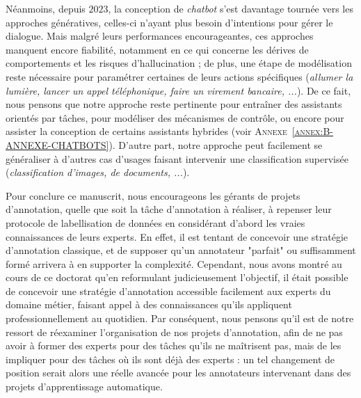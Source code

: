 		Néanmoins, depuis $2023$, la conception de \textit{chatbot} s'est davantage tournée vers les approches génératives, celles-ci n'ayant plus besoin d'intentions pour gérer le dialogue.
		Mais malgré leurs performances encourageantes, ces approches manquent encore fiabilité, notamment en ce qui concerne les dérives de comportements et les risques d'hallucination ; de plus, une étape de modélisation reste nécessaire pour paramétrer certaines de leurs actions spécifiques (\textit{allumer la lumière, lancer un appel téléphonique, faire un virement bancaire, ...}).
		De ce fait, nous pensons que notre approche reste pertinente pour entraîner des assistants orientés par tâches, pour modéliser des mécanismes de contrôle, ou encore pour assister la conception de certains assistants hybrides (voir \textsc{Annexe~\ref{annex:B-ANNEXE-CHATBOTS}}).
		D'autre part, notre approche peut facilement se généraliser à d'autres cas d'usages faisant intervenir une classification supervisée (\textit{classification d'images, de documents, ...}).
		
		Pour conclure ce manuscrit, nous encourageons les gérants de projets d'annotation, quelle que soit la tâche d'annotation à réaliser, à repenser leur protocole de labellisation de données en considérant d'abord les vraies connaissances de leurs experts.
		En effet, il est tentant de concevoir une stratégie d'annotation classique, et de supposer qu'un annotateur "parfait" ou suffisamment formé arrivera à en supporter la complexité.
		Cependant, nous avons montré au cours de ce doctorat qu'en reformulant judicieusement l'objectif, il était possible de concevoir une stratégie d'annotation accessible facilement aux experts du domaine métier, faisant appel à des connaissances qu'ils appliquent professionnellement au quotidien.
		Par conséquent, nous pensons qu'il est de notre ressort de réexaminer l'organisation de nos projets d'annotation, afin de ne pas avoir à former des experts pour des tâches qu'ils ne maîtrisent pas, mais de les impliquer pour des tâches où ils sont déjà des experts : un tel changement de position serait alors une réelle avancée pour les annotateurs intervenant dans des projets d'apprentissage automatique.